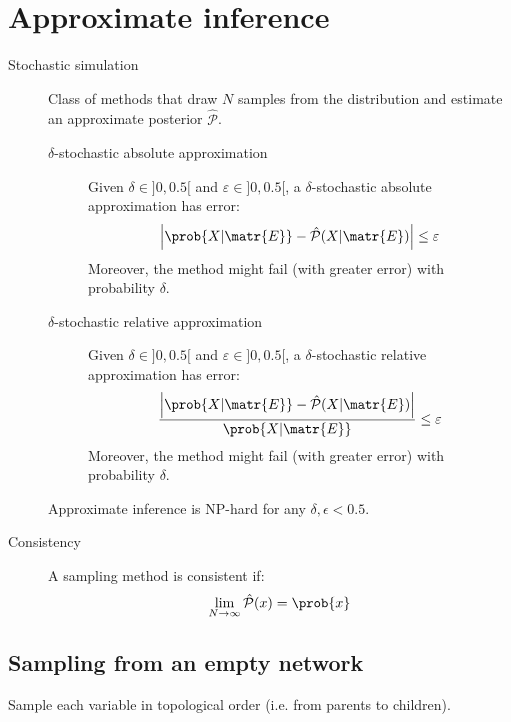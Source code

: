 \chapter{Approximate inference}

\begin{description}
    \item[Stochastic simulation] 
        Class of methods that draw $N$ samples from the distribution
        and estimate an approximate posterior $\hat{\mathcal{P}}$.

        \begin{description}
            \item[$\delta$-stochastic absolute approximation] 
                Given $\delta \in ]0, 0.5[$ and $\varepsilon \in ]0, 0.5[$, a $\delta$-stochastic absolute approximation has error:
                \[ \left\vert \prob{X | \matr{E}} - \hat{\mathcal{P}}(X | \matr{E}) \right\vert \leq \varepsilon \]
                Moreover, the method might fail (with greater error) with probability $\delta$.

            \item[$\delta$-stochastic relative approximation] 
                Given $\delta \in ]0, 0.5[$ and $\varepsilon \in ]0, 0.5[$, a $\delta$-stochastic relative approximation has error:
                \[ \frac{\left\vert \prob{X | \matr{E}} - \hat{\mathcal{P}}(X | \matr{E}) \right\vert}{\prob{X | \matr{E}}} \leq \varepsilon \]
                Moreover, the method might fail (with greater error) with probability $\delta$.
        \end{description}

        \begin{theorem}
            Approximate inference is NP-hard for any $\delta, \epsilon < 0.5$.
        \end{theorem}

    \item[Consistency] 
        A sampling method is consistent if:
        \[ \lim_{N \rightarrow \infty} \hat{\mathcal{P}}(x) = \prob{x} \]
\end{description}



\section{Sampling from an empty network}

Sample each variable in topological order (i.e. from parents to children).

